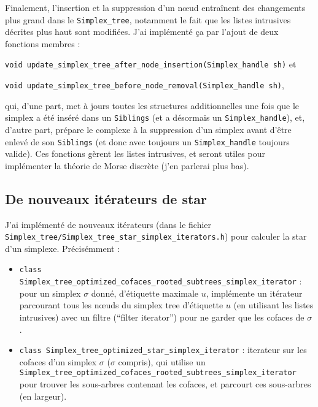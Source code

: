 \documentclass[11pt]{amsart}
\numberwithin{equation}{section}
\theoremstyle{plain}
\theoremstyle{definition}
\begin{document}
\begin{itemize}
\medskip

Finalement, l'insertion et la suppression d'un n\oe ud entraînent des changements plus grand dans le {\tt Simplex\_tree}, notamment le fait que les listes intrusives décrites plus haut sont modifiées. J'ai implémenté ça par l'ajout de deux fonctions membres :

\medskip

  {\tt void update\_simplex\_tree\_after\_node\_insertion(Simplex\_handle sh)} et
  
\smallskip

  {\tt void update\_simplex\_tree\_before\_node\_removal(Simplex\_handle sh)},

\medskip

qui, d'une part, met à jours toutes les structures additionnelles une fois que le simplex a été inséré dans un {\tt Siblings} (et a désormais un {\tt Simplex\_handle}), et, d'autre part, prépare le complexe à la suppression d'un simplex avant d'être enlevé de son {\tt Siblings} (et donc avec toujours un {\tt Simplex\_handle} toujours valide). Ces fonctions gèrent les listes intrusives, et seront utiles pour implémenter la théorie de Morse discrète (j'en parlerai plus bas). 

\end{itemize}

\subsection{De nouveaux itérateurs de star}

J'ai implémenté de nouveaux itérateurs (dans le fichier {\tt Simplex\_tree/Simplex\_tree\_star\_simplex\_iterators.h}) pour calculer la star d'un simplexe. Précisémment :

\begin{itemize}
%
\item {\tt class Simplex\_tree\_optimized\_cofaces\_rooted\_subtrees\_simplex\_iterator} : pour un simplex $\sigma$ donné, d'étiquette maximale $u$, implémente un itérateur parcourant tous les n\oe uds du simplex tree d'étiquette $u$ (en utilisant les listes intrusives) avec un filtre (``filter iterator'') pour ne garder que les cofaces de $\sigma$.
%
\item {\tt class Simplex\_tree\_optimized\_star\_simplex\_iterator} : iterateur sur les cofaces d'un simplex $\sigma$ ($\sigma$ compris), qui utilise un {\tt Simplex\_tree\_optimized\_cofaces\_rooted\_subtrees\_simplex\_iterator} pour trouver les sous-arbres contenant les cofaces, et parcourt ces sous-arbres (en largeur).
\end{itemize}
\end{document}
